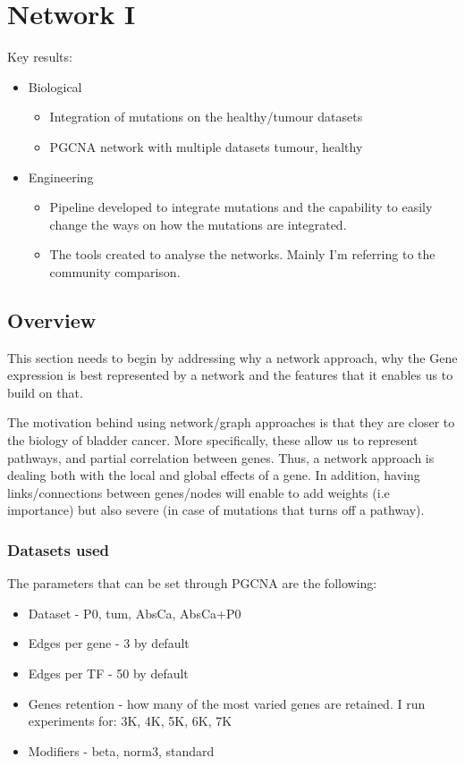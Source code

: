 \section{Network I}


Key results:
\begin{itemize}
    \item Biological
          \begin{itemize}
              \item Integration of mutations on the healthy/tumour datasets
              \item PGCNA network with multiple datasets tumour, healthy
          \end{itemize}
    \item Engineering
          \begin{itemize}
              \item Pipeline developed to integrate mutations and the capability to easily change the ways on how the mutations are integrated.
              \item The tools created to analyse the networks. Mainly I'm referring to the community comparison.
          \end{itemize}
\end{itemize}



\subsection{Overview}

This section needs to begin by addressing why a network approach, why the Gene expression is best represented by a network and the features that it enables us to build on that.

% 
The motivation behind using network/graph approaches is that they are closer to the biology of bladder cancer. More specifically, these allow us to represent pathways, and partial correlation between genes. Thus, a network approach is dealing both with the local and global effects of a gene. In addition, having links/connections between genes/nodes will enable to add weights (i.e importance) but also severe (in case of mutations that turns off a pathway).


\subsubsection{Datasets used}


The parameters that can be set through PGCNA are the following:
\begin{itemize}
    \item Dataset - P0, tum, AbsCa, AbsCa+P0
    \item Edges per gene - 3 by default
    \item Edges per TF - 50 by default
    \item Genes retention - how many of the most varied genes are retained. I run experiments for: 3K, 4K, 5K, 6K, 7K
    \item Modifiers - beta, norm3, standard
\end{itemize}


